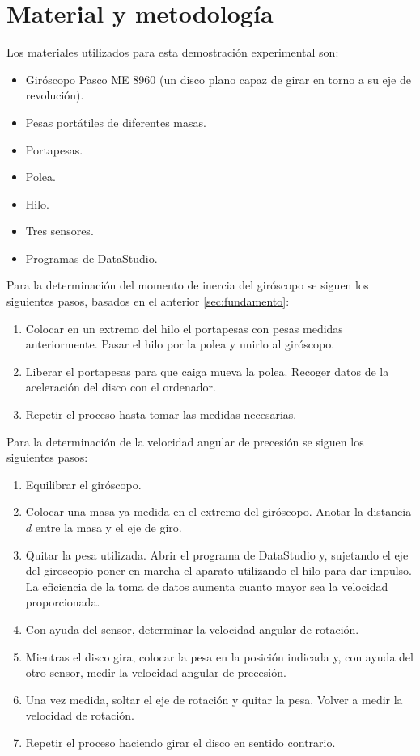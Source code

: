 \documentclass[a4paper]{article}
\begin{document}
\section{Material y metodología}
Los materiales utilizados para esta demostración experimental son:
\begin{itemize}
\item Giróscopo Pasco ME 8960 (un disco plano capaz de girar en torno a su eje de revolución).
\item Pesas portátiles de diferentes masas.
\item Portapesas.
\item Polea.
\item Hilo.
\item Tres sensores.
\item Programas de DataStudio.
\end{itemize}
Para la determinación del momento de inercia del giróscopo se siguen los siguientes pasos, basados en el anterior \ref{sec:fundamento}:
\begin{enumerate}
\item Colocar en un extremo del hilo el portapesas con pesas medidas anteriormente. Pasar el hilo por la polea y unirlo al giróscopo.
\item Liberar el portapesas para que caiga mueva la polea. Recoger datos de la aceleración del disco con el ordenador. 
\item Repetir el proceso hasta tomar las medidas necesarias.
\end{enumerate}
Para la determinación de la velocidad angular de precesión se siguen los siguientes pasos:
\begin{enumerate}
\item Equilibrar el giróscopo.
\item Colocar una masa ya medida en el extremo del giróscopo. Anotar la distancia $d$ entre la masa y el eje de giro.
\item Quitar la pesa utilizada. Abrir el programa de DataStudio y, sujetando el eje del giroscopio poner en marcha el aparato utilizando el hilo para dar impulso. La eficiencia de la toma de datos aumenta cuanto mayor sea la velocidad proporcionada.
\item Con ayuda del sensor, determinar la velocidad angular de rotación.
\item Mientras el disco gira, colocar la pesa en la posición indicada y, con ayuda del otro sensor, medir la velocidad angular de precesión.
\item Una vez medida, soltar el eje de rotación y quitar la pesa. Volver a medir la velocidad de rotación. 
\item Repetir el proceso haciendo girar el disco en sentido contrario.
\end{enumerate}
\end{document}
